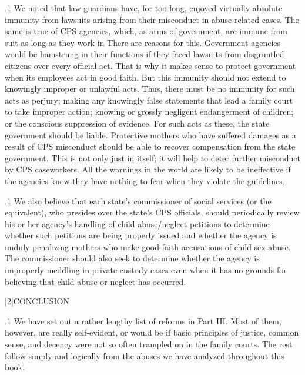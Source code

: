 \documentclass[11pt, twoside]{article}
\begin{document}
{\p.1{%
\noindent{}We noted that law guardians have, for too long, enjoyed virtually
absolute immunity from lawsuits arising from their misconduct in
abuse-related cases. The same is true of CPS agencies, which, as arms
of government, are immune from suit as long as they work in  There are reasons for this. Government agencies would be hamstrung in their functions if they faced lawsuits from disgruntled citizens
over every official act. That is why it makes sense to protect government when its employees act in good faith. But this immunity should
not extend to knowingly improper or unlawful acts. Thus, there must
be no immunity for such acts as perjury; making any knowingly false
statements that lead a family court to take improper action; knowing or
grossly negligent endangerment of children; or the conscious suppression of evidence. For such acts as these, the state government should
be liable. Protective mothers who have suffered damages as a result of
CPS misconduct should be able to recover compensation from the state
government. This is not only just in itself; it will help to deter further misconduct by CPS caseworkers. All the warnings in the world are likely to
be ineffective if the agencies know they have nothing to fear when they
violate the guidelines.
}%

\p.1{%
We also believe that each state’s commissioner of social services (or
the equivalent), who presides over the state’s CPS officials, should periodically review his or her agency’s handling of child abuse/neglect
petitions to determine whether such petitions are being properly issued
and whether the agency is unduly penalizing mothers who
make good-faith accusations of child sex abuse. The commissioner should also seek
to determine whether the agency is improperly meddling in private custody cases even when it has no grounds for believing that child abuse or
neglect has occurred.
}%


\s|2|{CONCLUSION}

\p.1{%
\noindent{}We have set out a rather lengthy list of reforms in Part III. Most of them,
however, are really self-evident, or would be if basic principles of justice,
common sense, and decency were not so often trampled on in the family
courts. The rest follow simply and logically from the abuses we have
analyzed throughout this book.
}%

}
\end{document}
